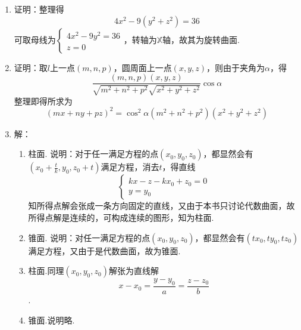 \documentclass[UTF8]{ctexart}
\begin{document}
\begin{enumerate}
\item 证明：整理得$$4x^2-9\left(y^2+z^2\right)=36$$可取母线为$\left\{\begin{array}{l}4x^2-9y^2=36\\z=0\end{array}\right.$，转轴为$\mathbb{X}$轴，故其为旋转曲面.

\item 证明：取$l$上一点$\left(m,n,p\right)$，圆周面上一点$\left(x,y,z\right)$，则由于夹角为$\alpha$，得$$\frac{\left(m,n,p\right)\left(x,y,z\right)}{\sqrt{m^2+n^2+p^2}\sqrt{x^2+y^2+z^2}}\cos\alpha$$整理即得所求为$$\left(mx+ny+pz\right)^2=\cos^2\alpha\left(m^2+n^2+p^2\right)\left(x^2+y^2+z^2\right)$$

\item 解：\begin{enumerate}[(1)]
\item 柱面. 说明：对于任一满足方程的点$\left(x_0,y_0,z_0\right)$，都显然会有$\left(x_0+\displaystyle\frac{t}{k},y_0,z_0+t\right)$满足方程，消去$t$，得直线$$\left\{\begin{array}{l}kx-z-kx_0+z_0=0\\y=y_0\end{array}\right.$$知所得点解会张成一条方向固定的直线，又由于本书只讨论代数曲面，故所得点解是连续的，可构成连续的图形，知为柱面. 
\item 锥面. 说明：对任一满足方程的点$\left(x_0,y_0,z_0\right)$，都显然会有$\left(tx_0,ty_0,tz_0\right)$满足方程，又由于是代数曲面，故为锥面. 
\item 柱面.同理$\left(x_0,y_0,z_0\right)$解张为直线解$$x-x_0=\frac{y-y_0}{a}=\frac{z-z_0}{b}$$.
\item 锥面.说明略. 
\end{enumerate}
\end{enumerate}
\end{document}
